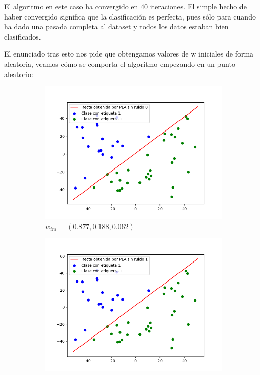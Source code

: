 \documentclass[12pt,a4paper]{article}
\begin{document}
El algoritmo en este caso ha convergido en 40 iteraciones. El simple hecho de haber convergido significa que la clasificación es perfecta, pues sólo para cuando ha dado una pasada completa al dataset y todos los datos estaban bien clasificados.

El enunciado tras esto nos pide que obtengamos valores de w iniciales de forma aleatoria, veamos cómo se comporta el algoritmo empezando en un punto aleatorio:

\begin{figure}[H]
	\centering
	\begin{subfigure}{0.32\textwidth}
		\includegraphics[scale=0.37]{./Imagenes/ej2-2.png}
		\caption{$w_{ini} = (0.877,0.188,0.062)$}
	\end{subfigure}
	\begin{subfigure}{0.33\textwidth}
		\includegraphics[scale=0.37]{./Imagenes/ej2-3.png}

\end{subfigure}
\end{figure}
\end{document}
